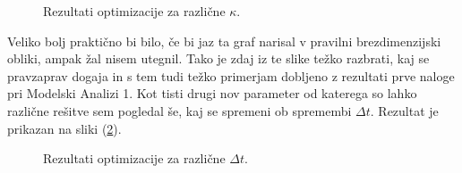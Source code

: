 \documentclass[a4paper]{article}
\begin{document}
\begin{figure}[H]
    \centering
    \caption{Rezultati optimizacije za različne $\kappa$.}
    \label{fig:semafor_results}
\end{figure}

Veliko bolj praktično bi bilo, če bi jaz ta graf narisal v pravilni brezdimenzijski obliki, ampak žal nisem
utegnil. Tako je zdaj iz te slike težko razbrati, kaj se pravzaprav dogaja in s tem tudi težko primerjam 
dobljeno z rezultati prve naloge pri Modelski Analizi 1. Kot tisti drugi nov parameter od katerega so lahko 
različne rešitve sem pogledal še, kaj se spremeni ob spremembi $\Delta t$. Rezultat je prikazan na sliki 
(\ref{fig:semafor_results2}). \\

\begin{figure}[H]
    \centering
    \caption{Rezultati optimizacije za različne $\Delta t$.}
    \label{fig:semafor_results2}
\end{figure}
\end{document}
